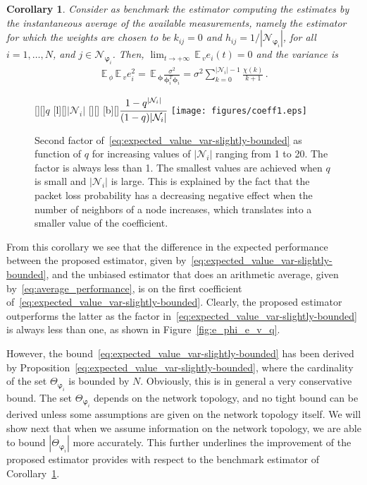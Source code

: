 \documentclass[a4paper,notitlepage,onecolumn]{article}
\def\phib{\boldsymbol{\phi}}
\def\varphib{\boldsymbol{\varphi}}
\def\E{\,\mathds{E}\,}
\newtheorem{corollary}[theorem]{Corollary}
\numberwithin{equation}{section}
\begin{document}
\begin{corollary} \label{cor:benchest}
Consider as benchmark the estimator computing the estimates by the
instantaneous average of the available measurements, namely the
estimator for which the weights are chosen to be $k_{ij}= 0$ and
$h_{ij} = 1/|\mathcal{N}_{\varphib_i}|$, for all $i = 1,\dots,N$,
and $j\in\mathcal{N}_{\varphib_i}$. Then, $\lim_{t\rightarrow
+\infty} \E_v e_i(t) = 0$ and the variance is
\begin{align}
    \E_\phi \E_v e_i^2 = \E_{\phib}
        \frac{\sigma^2}{\phib_i^T\phib_i}=\sigma^2\sum_{k = 0}^{|\mathcal{N}_{i}|-1} \frac{\chi(k)}{k+1}  \,.
    \label{eq:average_performance}
\end{align}
\end{corollary}
\begin{figure}
    \centering
    [][]{$q$}
    [l][]{$|\mathcal{N}_i|$}
    [][]{}
    [b][]{$\cfrac{1-q^{|\mathcal{N}_i|}}{(1-q)|\mathcal{N}_i|}$}
    \texttt{[image: figures/coeff1.eps]}
    \caption{Second factor of~\eqref{eq:expected_value_var-slightly-bounded} as function of $q$ for increasing values of $|\mathcal{N}_i|$
    ranging from 1 to 20. The factor is always less than 1. The smallest values are achieved when
    $q$ is small and $|\mathcal{N}_i|$ is large. This is explained by the fact that the packet loss probability has a decreasing negative effect
    when the number of neighbors of a node increases, which translates into a smaller value of the coefficient.}\label{fig:coeff1}
\end{figure}


From this corollary we see that the difference in the expected
performance between the proposed estimator, given
by~\eqref{eq:expected_value_var-slightly-bounded}, and the
unbiased estimator that does an arithmetic average, given
by~\eqref{eq:average_performance}, is on the first coefficient
of~\eqref{eq:expected_value_var-slightly-bounded}. Clearly, the
proposed estimator outperforms the latter as the factor in~\eqref{eq:expected_value_var-slightly-bounded} is always
less than one, as shown in Figure~\ref{fig:e_phi_e_v_q}.

However, the bound~\eqref{eq:expected_value_var-slightly-bounded}
has been derived by
Proposition~\ref{eq:expected_value_var-slightly-bounded}, where
the cardinality of the set $\Theta_{\varphib_i}$ is bounded by
$N$. Obviously, this is in general a very conservative bound. The
set $\Theta_{\varphib_i}$ depends on the network topology, and no
tight bound can be derived unless some assumptions are given on
the network topology itself. We will show next that when we assume
information on the network topology, we are able to bound
$|\Theta_{\varphib_i}|$ more accurately. This further underlines
the improvement of the proposed estimator provides with respect to
the benchmark estimator of Corollary~\ref{cor:benchest}.
\end{document}

